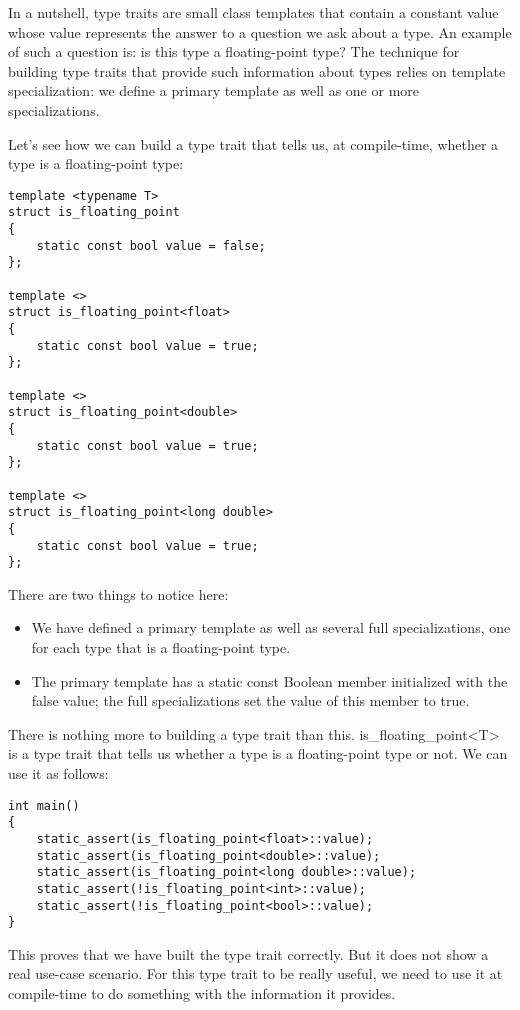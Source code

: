 In a nutshell, type traits are small class templates that contain a constant value whose value represents the answer to a question we ask about a type. An example of such a question is: is this type a floating-point type? The technique for building type traits that provide such information about types relies on template specialization: we define a primary template as well as one or more specializations.

Let’s see how we can build a type trait that tells us, at compile-time, whether a type is a floating-point type:

\begin{lstlisting}[style=styleCXX]
template <typename T>
struct is_floating_point
{
	static const bool value = false;
};

template <>
struct is_floating_point<float>
{
	static const bool value = true;
};

template <>
struct is_floating_point<double>
{
	static const bool value = true;
};

template <>
struct is_floating_point<long double>
{
	static const bool value = true;
};
\end{lstlisting}

There are two things to notice here:

\begin{itemize}
\item
We have defined a primary template as well as several full specializations, one for each type that is a floating-point type.

\item
The primary template has a static const Boolean member initialized with the false value; the full specializations set the value of this member to true.
\end{itemize}

There is nothing more to building a type trait than this. is\_floating\_point<T> is a type trait that tells us whether a type is a floating-point type or not. We can use it as follows:

\begin{lstlisting}[style=styleCXX]
int main()
{
	static_assert(is_floating_point<float>::value);
	static_assert(is_floating_point<double>::value);
	static_assert(is_floating_point<long double>::value);
	static_assert(!is_floating_point<int>::value);
	static_assert(!is_floating_point<bool>::value);
}
\end{lstlisting}

This proves that we have built the type trait correctly. But it does not show a real use-case scenario. For this type trait to be really useful, we need to use it at compile-time to do something with the information it provides. 

